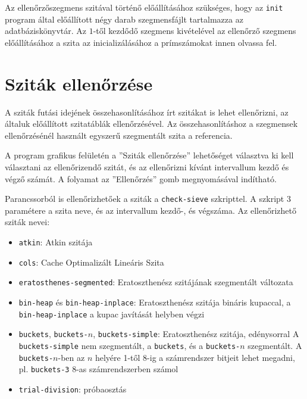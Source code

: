 Az ellenőrzőszegmens szitával történő előállításához szükséges, hogy az \texttt{init} program által előállított négy darab szegmensfájlt tartalmazza az adatbáziskönyvtár.
Az $1$-től kezdődő szegmens kivételével az ellenőrző szegmens előállításához a szita az inicializálásához a prímszámokat innen olvassa fel.

\section{Sziták ellenőrzése}
\label{sec:szitak-ellenorzese}


A sziták futási idejének összehasonlításához írt szitákat is lehet ellenőrizni, az általuk előállított szitatáblák ellenőrzésével.
Az összehasonlításhoz a szegmensek ellenőrzésénél használt egyszerű szegmentált szita a referencia.

A program grafikus felületén a ''Sziták ellenőrzése'' lehetőséget választva ki kell választani az ellenőrizendő szitát, és az ellenőrizni kívánt intervallum kezdő és végző számát.
A folyamat az ''Ellenőrzés'' gomb megnyomásával indítható.

Parancssorból is ellenőrizhetőek a sziták a \texttt{check-sieve} szkripttel.
A szkript 3 paramétere a szita neve, és az intervallum kezdő-, és végszáma.
Az ellenőrizhető sziták nevei:
\begin{itemize}
\item \texttt{atkin}: Atkin szitája\cite{atkin}
\item \texttt{cols}: Cache Optimalizált Lineáris Szita\cite{cols}
\item \texttt{eratosthenes-segmented}: Eratoszthenész szitájának szegmentált változata
\item \texttt{bin-heap} és \texttt{bin-heap-inplace}: Eratoszthenész szitája bináris kupaccal,
	a \texttt{bin-heap-inplace} a kupac javítását helyben végzi
\item \texttt{buckets}, \texttt{buckets-}$n$, \texttt{buckets-simple}: Eratoszthenész szitája, edénysorral
	A \texttt{buckets-simple} nem szegmentált, a \texttt{buckets}, és a \texttt{buckets-}$n$ szegmentált.
	A \texttt{buckets-}$n$-ben az $n$ helyére 1-től 8-ig a számrendszer bitjeit lehet megadni,
	pl. \texttt{buckets-3} 8-as számrendszerben számol
\item \texttt{trial-division}: próbaosztás
\end{itemize}

